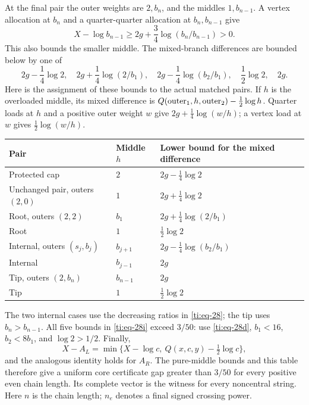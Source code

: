 \documentclass[11pt]{article}
\numberwithin{equation}{section}
\theoremstyle{definition}\newtheorem{definition}[theorem]{Definition}
\theoremstyle{remark}\newtheorem{remark}[theorem]{Remark}
\begin{document}
At the final pair the outer weights are \(2,b_n\), and the middles \(1,b_{n-1}\). A vertex allocation at \(b_n\) and a quarter-quarter allocation at \(b_n,b_{n-1}\) give
\begin{equation}\label{ti:eq-28h}
X-\log b_{n-1}\ge2g+\frac34\log(b_n/b_{n-1})>0.
\end{equation}
This also bounds the smaller middle. The mixed-branch differences are bounded below by one of
\begin{equation}\label{ti:eq-28i}
2g-\frac14\log2,\quad
2g+\frac14\log(2/b_1),\quad
2g-\frac14\log(b_2/b_1),\quad
\frac12\log2,\quad 2g.
\end{equation}
Here is the assignment of these bounds to the actual matched pairs.
If \(h\) is the overloaded middle, its mixed difference is
\(Q(\hbox{outer}_1,h,\hbox{outer}_2)-\tfrac12\log h\).
Quarter loads at \(h\) and a positive outer weight \(w\) give
\(2g+\tfrac14\log(w/h)\); a vertex load at \(w\) gives
\(\tfrac12\log(w/h)\).
\begin{center}
\begin{tabular}{@{}lll@{}}
\toprule
Pair & Middle \(h\) & Lower bound for the mixed difference\\
\midrule
Protected cap & \(2\) & \(2g-\tfrac14\log2\)\\
Unchanged pair, outers \((2,0)\) & \(1\) & \(2g+\tfrac14\log2\)\\
Root, outers \((2,2)\) & \(b_1\) & \(2g+\tfrac14\log(2/b_1)\)\\
Root & \(1\) & \(\tfrac12\log2\)\\
Internal, outers \((s_j,b_j)\) & \(b_{j+1}\) &
 \(2g-\tfrac14\log(b_2/b_1)\)\\
Internal & \(b_{j-1}\) & \(2g\)\\
Tip, outers \((2,b_n)\) & \(b_{n-1}\) & \(2g\)\\
Tip & \(1\) & \(\tfrac12\log2\)\\
\bottomrule
\end{tabular}
\end{center}
The two internal cases use the decreasing ratios in
\eqref{ti:eq-28}; the tip uses \(b_n>b_{n-1}\).
All five bounds in \eqref{ti:eq-28i} exceed \(3/50\): use
\eqref{ti:eq-28d}, \(b_1<16\), \(b_2<8b_1\), and
\(\log2>1/2\).
Finally,
\[
 X-A_L=\min\{X-\log c,\ Q(x,c,y)-\tfrac12\log c\},
\]
and the analogous identity holds for \(A_R\).
The pure-middle bounds and this table therefore give a uniform
core certificate gap greater than \(3/50\) for every positive
even chain length. Its complete vector is the witness for every
noncentral string. Here \(n\) is the chain length; \(n_e\) denotes
a final signed crossing power.
\end{document}
